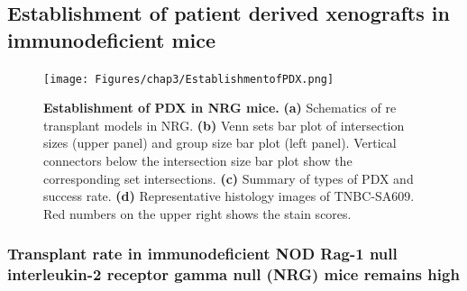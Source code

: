 \subsection{Establishment of patient derived xenografts in immunodeficient mice}


\begin{figure}
	\centering
	\texttt{[image: Figures/chap3/EstablishmentofPDX.png]}
	\caption[Establishment of PDX in NRG mice]
	{\small
	    \textbf{Establishment of PDX in NRG mice.}
	    \textbf{(a)} Schematics of re transplant models in NRG.
	    \textbf{(b)} Venn sets bar plot of intersection sizes (upper panel) and group size bar plot (left panel). Vertical connectors below the intersection size bar plot show the corresponding set intersections.
	    \textbf{(c)} Summary of types of PDX and success rate.
	     \textbf{(d)} Representative histology images of TNBC-SA609. Red numbers on the upper right shows the stain scores.
	}
	\label{fig:EstablishmentofPDX}
\end{figure}

\subsubsection{Transplant rate in immunodeficient NOD Rag-1 null interleukin-2 receptor gamma null (NRG) mice remains high}

